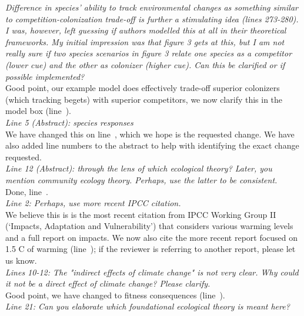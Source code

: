 \documentclass[11pt,letterpaper]{article}
\newcommand{\lr}[1]{line~\lineref{#1}}
\begin{document}
\emph{Difference in species' ability to track environmental changes as something similar to
competition-colonization trade-off is further a stimulating idea (lines 273-280). I was,
however, left guessing if authors modelled this at all in their theoretical frameworks. My
initial impression was that figure 3 gets at this, but I am not really sure if two species
scenarios in figure 3 relate one species as a competitor (lower cue) and the other as
colonizer (higher cue). Can this be clarified or if possible implemented?}\\

Good point, our example model does effectively trade-off superior colonizers (which tracking begets) with superior competitors, we now clarify this in the model box (\lr{r2colon}).\\

\emph{Line 5 (Abstract): species responses}\\

We have changed this on \lr{r3misc}, which we hope is the requested change. We have also added line numbers to the abstract to help with identifying the exact change requested.\\

\emph{Line 12 (Abstract): through the lens of which ecological theory? Later, you mention community
ecology theory. Perhaps, use the latter to be consistent.}\\

Done, \lr{r3misc1}.\\

\emph{Line 2: Perhaps, use more recent IPCC citation.}\\

We believe this is is the most recent citation from IPCC Working Group II (`Impacts, Adaptation and Vulnerability') that considers various warming levels and a full report on impacts. We now also cite the more recent report focused on 1.5 C of warming (\lr{cite15}); if the reviewer is referring to another report, please let us know. \\

\emph{Lines 10-12: The "indirect effects of climate change" is not very clear. Why could it not be
a direct effect of climate change? Please clarify.}\\

Good point, we have changed to fitness consequences (\lr{r3misc2}).\\

\emph{Line 21: Can you elaborate which foundational ecological theory is meant here?}\\
\end{document}
